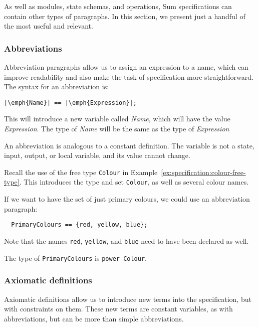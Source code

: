 As well as modules, state schemas, and operations, Sum specifications can contain other types of paragraphs. In this section, we present just a handful of the most useful and relevant.

\subsubsection*{Abbreviations}

Abbreviation paragraphs allow us to assign an expression to a name, which can improve readability and also make the task of specification more straightforward. The syntax for an abbreviation is:

\lstset{aboveskip=3mm}
\begin{lstlisting}[escapeinside={||}]
  |\emph{Name}| == |\emph{Expression}|;
\end{lstlisting}

This will introduce a new variable called \emph{Name}, which will have the value \emph{Expression}. The type of \emph{Name} will be the same as the type of \emph{Expression}

An abbreviation is analogous to a constant definition. The variable is not a state, input, output, or local variable, and its value cannot change.

\begin{example}
Recall the use of the free type \texttt{Colour} in Example~\ref{ex:specification:colour-free-type}. This introduces the type and set \texttt{Colour}, as well as several colour names.

If we want to have the set of just primary colours, we could use an abbreviation paragraph:

\lstset{aboveskip=3mm}
\begin{lstlisting}
  PrimaryColours == {red, yellow, blue};
\end{lstlisting}

Note that the names \texttt{red}, \texttt{yellow}, and \texttt{blue} need to have been declared as well.

The type of \texttt{PrimaryColours} is \texttt{power Colour}. 

\end{example}


\subsubsection*{Axiomatic definitions}

Axiomatic definitions allow us to introduce new terms into the specification, but with constraints on them. These new terms are constant variables, as with abbreviations, but can be more than simple abbreviations.

